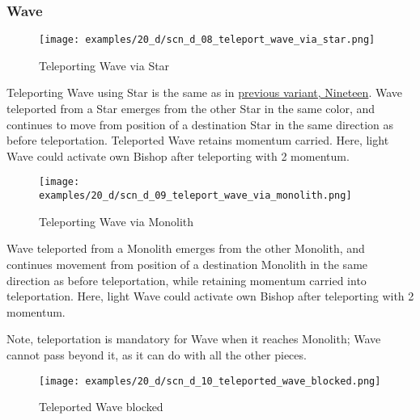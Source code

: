 \subsubsection*{Wave}

\vspace*{-1.2\baselineskip}
\noindent
\begin{figure}[!h]
\texttt{[image: examples/20\_d/scn\_d\_08\_teleport\_wave\_via\_star.png]}
\caption{Teleporting Wave via Star}
\label{fig:scn_d_08_teleport_wave_via_star}
\end{figure}

Teleporting Wave using Star is the same as in \hyperref[fig:scn_n_04_teleport_move_3]{previous variant, Nineteen}.
Wave teleported from a Star emerges from the other Star in the same color,
and continues to move from position of a destination Star in the same
direction as before teleportation. Teleported Wave retains momentum carried.
Here, light Wave could activate own Bishop after teleporting with 2 momentum.

\clearpage %

\vspace*{-3.2\baselineskip}
\noindent
\begin{figure}[!h]
\texttt{[image: examples/20\_d/scn\_d\_09\_teleport\_wave\_via\_monolith.png]}
\caption{Teleporting Wave via Monolith}
\label{fig:scn_d_09_teleport_wave_via_monolith}
\end{figure}

\vspace*{-0.3\baselineskip}
Wave teleported from a Monolith emerges from the other Monolith, and continues
movement from position of a destination Monolith in the same direction as before
teleportation, while retaining momentum carried into teleportation.
Here, light Wave could activate own Bishop after teleporting with 2 momentum.

Note, teleportation is mandatory for Wave when it reaches Monolith; Wave cannot
pass beyond it, as it can do with all the other pieces.

\clearpage %

\vspace*{-3.2\baselineskip}
\noindent
\begin{figure}[!h]
\texttt{[image: examples/20\_d/scn\_d\_10\_teleported\_wave\_blocked.png]}
\caption{Teleported Wave blocked}
\label{fig:scn_d_10_teleported_wave_blocked}
\end{figure}

